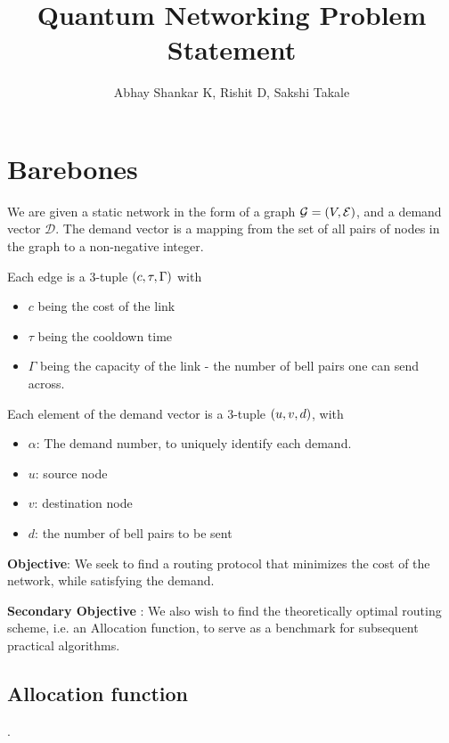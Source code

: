 \documentclass{amsart}
\begin{document}
    \title{Quantum Networking Problem Statement}
    \author{Abhay Shankar K, Rishit D, Sakshi Takale}
    \maketitle

    \section{Barebones}

    We are given a static network in the form of a graph \(\mathcal{G} = \left(V, \mathcal{E}\right)\), and a demand vector \(\mathcal{D}\). The demand vector is a mapping from the set of all pairs of nodes in the graph to a non-negative integer. 

    Each edge is a 3-tuple \(\left(c, \tau, \Gamma\right)\) with \begin{itemize}
        \item \(c\) being the cost of the link
        \item \(\tau\) being the cooldown time
        \item \(\Gamma\) being the capacity of the link - the number of bell pairs one can send across.
    \end{itemize}

    Each element of the demand vector is a 3-tuple \(\left(u, v, d\right)\), with \begin{itemize}
        \item \(\alpha\): The demand number, to uniquely identify each demand.
        \item \(u\): source node
        \item \(v\): destination node
        \item \(d\): the number of bell pairs to be sent
    \end{itemize}

    \textbf{Objective}:
    We seek to find a routing protocol that minimizes the cost of the network, while satisfying the demand. 

    \textbf{Secondary Objective} : We also wish to find the theoretically optimal routing scheme, i.e. an Allocation function, to serve as a benchmark for subsequent practical algorithms.
    
    \subsection{Allocation function}.
\end{document}
